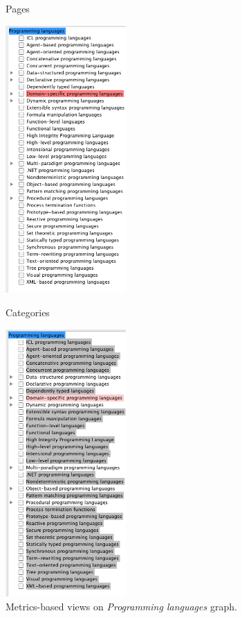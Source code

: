 
\begin{figure}[t!]
\parbox{.48\textwidth}{
Pages

\noindent 
\includegraphics[width=0.41\textwidth]{figures/plPagesTransitive.png}
}\hfill\parbox{.48\textwidth}{

Categories 

\noindent \includegraphics[width=0.41\textwidth]{figures/plSubcategoriesTransitive.png}
}

\vspace{-42\in}

\caption{Metrics-based views on \emph{Programming languages} graph.}
\label{F:plNumbers}
\vspace{-42\in}
\end{figure}

